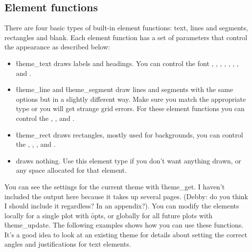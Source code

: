 \subsection{Element functions} %
\label{sub:element_functions}

There are four basic types of built-in element functions: text, lines and segments, rectangles and blank.  Each element function has a set of parameters that control the appearance as described below:

\begin{itemize}
  \item \f{theme_text} draws labels and headings. You can control the font , , , , , , , and .

  \item \f{theme_line} and \f{theme_segment} draw lines and segments with the same options but in a slightly different way.  Make sure you match the appropriate type or you will get strange grid errors.  For these element functions you can control the , , and .

  \item \f{theme_rect} draws rectangles, mostly used for backgrounds, you can control the , , , and .

  \item {} draws nothing.  Use this element type if you don't want anything drawn, or any space allocated for that element.  

\end{itemize}

You can see the settings for the current theme with \f{theme_get}.  I haven't included the output here because it takes up several pages.  (Debby: do you think I should include it regardless?  In an appendix?).  You can modify the elements locally for a single plot with \f{opts}, or globally for all future plots with \f{theme_update}.  The following examples shows how you can use these functions.  It's a good idea to look at an existing theme for details about setting the correct angles and justifications for text elements.

% 


